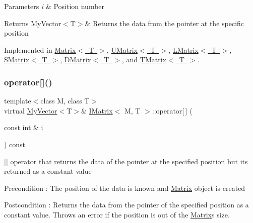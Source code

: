 \begin{DoxyParams}{Parameters}
{\em i} & Position number \\
\hline
\end{DoxyParams}
\begin{DoxyReturn}{Returns}
My\+Vector$<$\+T$>$\& Returns the data from the pointer at the specific position 
\end{DoxyReturn}


Implemented in \mbox{\hyperlink{class_matrix_aa9532c87a69bef256954e2309ca3fdd6}{Matrix$<$ T $>$}}, \mbox{\hyperlink{class_u_matrix_a0dea1e82fbf5ae67bec479c070b185dc}{U\+Matrix$<$ T $>$}}, \mbox{\hyperlink{class_l_matrix_a7eab2a6c57437448d21a04484844e359}{L\+Matrix$<$ T $>$}}, \mbox{\hyperlink{class_s_matrix_ab2092e3019526cd318f80731d7a226b5}{S\+Matrix$<$ T $>$}}, \mbox{\hyperlink{class_d_matrix_a01becea742ca6c07c14c9ca645bd64f0}{D\+Matrix$<$ T $>$}}, and \mbox{\hyperlink{class_t_matrix_adf8f6ca427e37e867e89c215f4f9ef0b}{T\+Matrix$<$ T $>$}}.

\mbox{\label{class_i_matrix_a1ed62ee6700728045083c7f0df3e3e62}} 
\subsubsection{\texorpdfstring{operator[]()}{operator[]()}\hspace{0.1cm}{\footnotesize\ttfamily [2/2]}}
{\footnotesize\ttfamily template$<$class M, class T$>$ \\
virtual \mbox{\hyperlink{class_my_vector}{My\+Vector}}$<$T$>$\& \mbox{\hyperlink{class_i_matrix}{I\+Matrix}}$<$ M, T $>$\+::operator\mbox{[}$\,$\mbox{]} (\begin{DoxyParamCaption}\item[{const int \&}]{i }\end{DoxyParamCaption}) const\hspace{0.3cm}{\ttfamily [pure virtual]}}



\mbox{[}\mbox{]} operator that returns the data of the pointer at the specified position but its returned as a constant value 

\begin{DoxyPrecond}{Precondition}
\+: The position of the data is known and \mbox{\hyperlink{class_matrix}{Matrix}} object is created 
\end{DoxyPrecond}
\begin{DoxyPostcond}{Postcondition}
\+: Returns the data from the pointer of the specified position as a constant value. Throws an error if the position is out of the \mbox{\hyperlink{class_matrix}{Matrix}}\textquotesingle{}s size. 
\end{DoxyPostcond}


